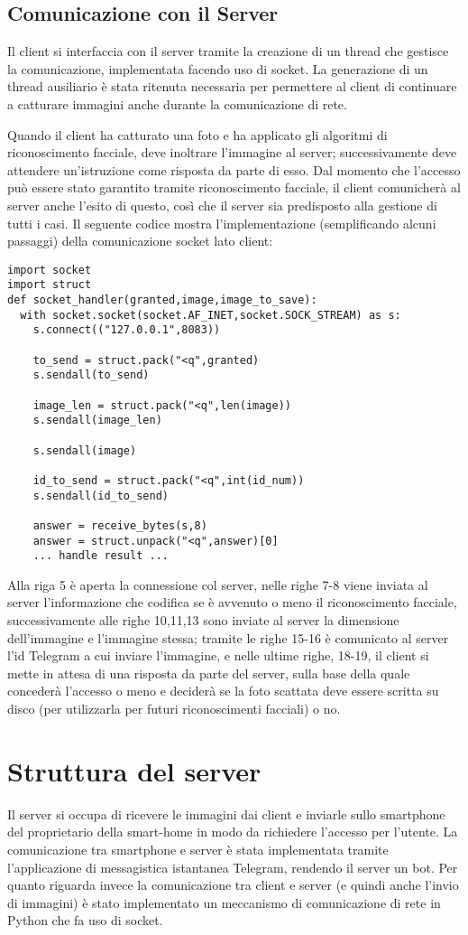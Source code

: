 \subsection{Comunicazione con il Server}
Il client si interfaccia con il server tramite la creazione di un thread che gestisce la comunicazione, implementata facendo uso di socket. La generazione di un thread ausiliario è stata ritenuta necessaria per permettere al client di continuare a catturare immagini anche durante la comunicazione di rete. 

Quando il client ha catturato una foto e ha applicato gli algoritmi di riconoscimento facciale, deve inoltrare l'immagine al server; successivamente deve attendere un'istruzione come risposta  da parte di esso. Dal momento che l'accesso può essere stato garantito tramite riconoscimento facciale, il client comunicherà al server anche l'esito di questo, così che il server sia predisposto alla gestione di tutti i casi. Il seguente codice mostra l'implementazione (semplificando alcuni passaggi) della comunicazione socket lato client:
\begin{lstlisting}
import socket
import struct
def socket_handler(granted,image,image_to_save):
  with socket.socket(socket.AF_INET,socket.SOCK_STREAM) as s:
    s.connect(("127.0.0.1",8083))

    to_send = struct.pack("<q",granted)
    s.sendall(to_send)

    image_len = struct.pack("<q",len(image))
    s.sendall(image_len)

    s.sendall(image)

    id_to_send = struct.pack("<q",int(id_num))
    s.sendall(id_to_send)

    answer = receive_bytes(s,8)
    answer = struct.unpack("<q",answer)[0]
    ... handle result ...
\end{lstlisting}
Alla riga 5 è aperta la connessione col server, nelle righe 7-8 viene inviata al server l'informazione che codifica se è avvenuto o meno il riconoscimento facciale, successivamente alle righe 10,11,13 sono inviate al server la dimensione dell'immagine e l'immagine stessa; tramite le righe 15-16 è comunicato al server l'id Telegram a cui inviare l'immagine, e nelle ultime righe, 18-19, il client si mette in attesa di una risposta da parte del server, sulla base della quale concederà l'accesso o meno e deciderà se la foto scattata deve essere scritta su disco (per utilizzarla per futuri riconoscimenti facciali) o no.

\section{Struttura del server}
Il server si occupa di ricevere le immagini dai client e inviarle sullo smartphone del proprietario della smart-home in modo da richiedere l'accesso per l'utente. La comunicazione tra smartphone e server è stata implementata tramite l'applicazione di messagistica istantanea Telegram, rendendo il server un bot. Per quanto riguarda invece la comunicazione  tra client e server (e quindi anche l'invio di immagini) è stato implementato un meccanismo di comunicazione di rete in Python che fa uso di socket.

